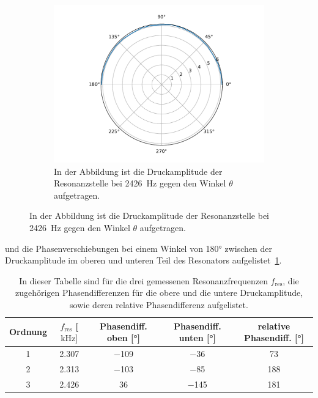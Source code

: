 \begin{figure}[ht]
                \centering
                \begin{subfigure}[b]{0.45\textwidth}
                    \centering
                    \includegraphics[scale=0.3]{./pictures/H_mol_resonanz_1_2426Hz.pdf}
                    \caption{In der Abbildung ist die Druckamplitude der Resonanzstelle bei \SI{2426}{\hertz} gegen den Winkel $\theta$ aufgetragen.}
                    \label{fig:H_mol_resonanz_1_2426Hz}
                \end{subfigure}
            \end{figure}
            \FloatBarrier
            und die Phasenverschiebungen bei einem Winkel von 180° zwischen der Druckamplitude im oberen und unteren Teil des Resonators aufgelistet~\ref{tab:rel_phasenverschiebung}.
            \FloatBarrier
            \begin{table}[h]
                \centering
                \caption{In dieser Tabelle sind für die drei gemessenen Resonanzfrequenzen $f_{\text{res}}$, die zugehörigen Phasendifferenzen für die obere und die untere Druckamplitude, sowie deren relative Phasendifferenz aufgelistet.}
                \label{tab:rel_phasenverschiebung}
                \begin{tabular}{c c c c c}
                \toprule
                {Ordnung} & {$f_{\text{res}}$ [$\si{\kilo\hertz}]$} & {Phasendiff. oben [°]} & {Phasendiff. unten [°]} & {relative Phasendiff. [°]} \\
                \midrule
                \num{1}  & \num{2.307}  &  \num{-109}  &  \num{-36}   & \num{73}      \\
                \num{2}  & \num{2.313}  &  \num{-103}  &  \num{-85}   & \num{188}     \\
                \num{3}  & \num{2.426}  &  \num{36}    &  \num{-145}  & \num{181}     \\
                \bottomrule
                \end{tabular}
            \end{table}
